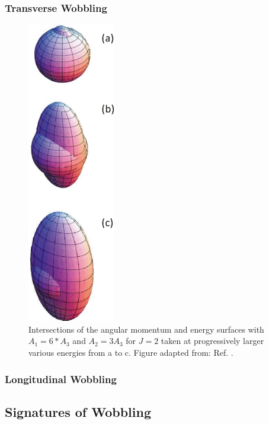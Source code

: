 \subsubsection{Transverse Wobbling}
\label{ssec:models-transverse-wobbling}
\begin{figure}[t!]
\centerline{\includegraphics[height=0.25\textheight]{./img/c2/simple_am_orbits.png}}
	\caption{Intersections of the angular momentum and energy surfaces with $A_1=6*A_3$ and $A_2=3A_3$ for $J=2$ taken at progressively larger various energies from a to c. Figure adapted from: Ref. \cite{frauendorfTransverseWobbling}.\label{fig:chp2-transverse-am-orbits}}
\end{figure}

\subsubsection{Longitudinal Wobbling}
\label{ssec:models-long-wobbling}

\subsection{Signatures of Wobbling}
\label{sec:models-sig}
